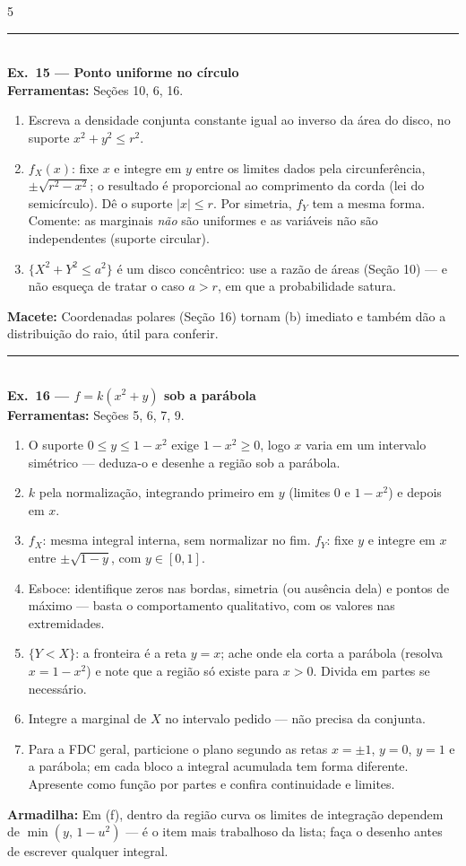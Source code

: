 \documentclass[a4paper,8pt]{extarticle}
\newcommand{\tit}[1]{\vspace{2pt}\textcolor{azul}{\rule{\linewidth}{0.6pt}}\\[1pt]\textbf{\textcolor{azul}{#1}}\\[1pt]}
\newcommand{\mac}[1]{\textcolor{verde}{\textbf{Macete:}} #1\par}
\newcommand{\arm}[1]{\textcolor{vinho}{\textbf{Armadilha:}} #1\par}
\newcommand{\ferr}[1]{\textbf{Ferramentas:} #1\par}
\begin{document}
\begin{multicols*}{5}
\tit{Ex.\ 15 — Ponto uniforme no círculo}
\ferr{Seções 10, 6, 16.}
\begin{enumerate}
\item Escreva a densidade conjunta constante igual ao inverso da área do disco, no suporte $x^2+y^2\le r^2$.
\item[(a)] $f_X(x)$: fixe $x$ e integre em $y$ entre os limites dados pela circunferência, $\pm\sqrt{r^2-x^2}$; o resultado é proporcional ao comprimento da corda (lei do semicírculo). Dê o suporte $|x|\le r$. Por simetria, $f_Y$ tem a mesma forma. Comente: as marginais \emph{não} são uniformes e as variáveis não são independentes (suporte circular).
\item[(b)] $\{X^2+Y^2\le a^2\}$ é um disco concêntrico: use a razão de áreas (Seção 10) — e não esqueça de tratar o caso $a>r$, em que a probabilidade satura.
\end{enumerate}
\mac{Coordenadas polares (Seção 16) tornam (b) imediato e também dão a distribuição do raio, útil para conferir.}

\tit{Ex.\ 16 — $f=k(x^2+y)$ sob a parábola}
\ferr{Seções 5, 6, 7, 9.}
\begin{enumerate}
\item[0.] O suporte $0\le y\le 1-x^2$ exige $1-x^2\ge0$, logo $x$ varia em um intervalo simétrico — deduza-o e desenhe a região sob a parábola.
\item[(a)] $k$ pela normalização, integrando primeiro em $y$ (limites 0 e $1-x^2$) e depois em $x$.
\item[(b)] $f_X$: mesma integral interna, sem normalizar no fim. $f_Y$: fixe $y$ e integre em $x$ entre $\pm\sqrt{1-y}$, com $y\in[0,1]$.
\item[(c)] Esboce: identifique zeros nas bordas, simetria (ou ausência dela) e pontos de máximo — basta o comportamento qualitativo, com os valores nas extremidades.
\item[(d)] $\{Y<X\}$: a fronteira é a reta $y=x$; ache onde ela corta a parábola (resolva $x=1-x^2$) e note que a região só existe para $x>0$. Divida em partes se necessário.
\item[(e)] Integre a marginal de $X$ no intervalo pedido — não precisa da conjunta.
\item[(f)] Para a FDC geral, particione o plano segundo as retas $x=\pm1$, $y=0$, $y=1$ e a parábola; em cada bloco a integral acumulada tem forma diferente. Apresente como função por partes e confira continuidade e limites.
\end{enumerate}
\arm{Em (f), dentro da região curva os limites de integração dependem de $\min(y,\,1-u^2)$ — é o item mais trabalhoso da lista; faça o desenho antes de escrever qualquer integral.}


\end{multicols*}
\end{document}
